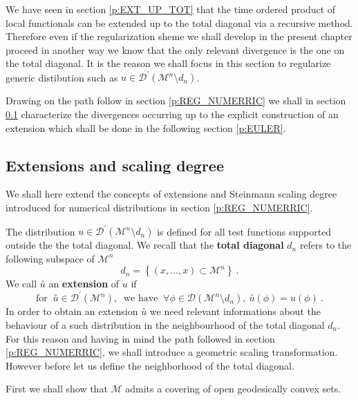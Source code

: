 \documentclass[11pt]{book}
\newcommand{\exte}[1]{\overset{\circ}{#1}}
\newcommand{\Dcal}{\mathcal{D}}
\newcommand{\Mcal}{\mathcal{M}}
\theoremstyle{break}
\begin{document}
We have seen in section \ref{p:EXT_UP_TOT} that the time ordered product of local functionals can be extended up to the total diagonal via a recursive method. Therefore even if the regularization sheme we shall develop in the present chapter proceed in another way we know that the only relevant divergence is the one on the total diagonal. It is the reason we shall focus in this section to regularize generic distibution such as $u \in \Dcal^\prime(\Mcal^n \setminus d_n )$.


Drawing on the path follow in section \ref{p:REG_NUMERRIC} we shall in section \ref{p:EXT_SD} characterize the divergences occurring up to the explicit construction of an extension which shall be done in the following section \ref{p:EULER}.


\subsection{Extensions and scaling degree}
\label{p:EXT_SD}


We shall here extend the concepts of extensions and Steinmann scaling degree introduced for numerical distributions in section \ref{p:REG_NUMERRIC}. 


The distribution $u \in \Dcal^\prime(\Mcal^n \setminus d_n )$ is defined for all test functions supported outside the the total diagonal. We recall that the \textbf{total diagonal} $d_n$ refers to the following subspace of $\Mcal^n$
%
\begin{equation}
d_n = \left\{ (x,\dots,x) \subset \Mcal^n \right\} \ .
\label{eq:total_diag_chap_3}
\end{equation}
%
We call $\exte{u}$ an \textbf{extension} of $u$ if 
%
\begin{equation*}
\mbox{for } \ \exte{u} \in \Dcal^\prime(\Mcal^n), \ \mbox{ we have } \ \forall \phi \in \Dcal\left(\Mcal^n \setminus d_n \right), \ \exte{u}(\phi) = u(\phi) \ .
\end{equation*}
%
In order to obtain an extension $\exte{u}$ we need relevant informations about the behaviour of a such distribution in the neighbourhood of the total diagonal $d_n$. For this reason and having in mind the path followed in section \ref{p:REG_NUMERRIC}, we shall introduce a geometric scaling transformation. However before let us define the neighborhood of the total diagonal.


First we shall show that $\Mcal$ admits a covering of open geodesically convex sets.
\end{document}
